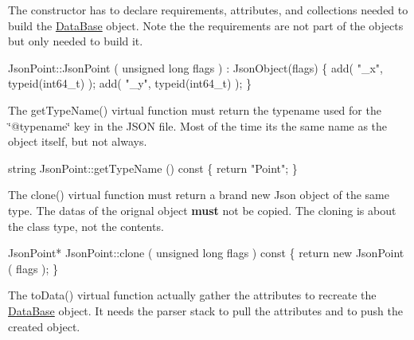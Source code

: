 The constructor has to declare requirements, attributes, and collections needed to build the \hyperlink{classHurricane_1_1DataBase}{Data\+Base} object. Note the the requirements are not part of the objects but only needed to build it.


\begin{DoxyCode}
JsonPoint::JsonPoint ( \textcolor{keywordtype}{unsigned} \textcolor{keywordtype}{long} flags )
  : JsonObject(flags)
\{
  add( \textcolor{stringliteral}{"\_x"}, \textcolor{keyword}{typeid}(int64\_t) );
  add( \textcolor{stringliteral}{"\_y"}, \textcolor{keyword}{typeid}(int64\_t) );
\}
\end{DoxyCode}


The {\ttfamily get\+Type\+Name()} virtual function must return the typename used for the {\ttfamily \char`\"{}@typename\char`\"{}} key in the J\+S\+ON file. Most of the time it\textquotesingle{}s the same name as the object itself, but not always.


\begin{DoxyCode}
\textcolor{keywordtype}{string} JsonPoint::getTypeName ()\textcolor{keyword}{ const}
\textcolor{keyword}{}\{ \textcolor{keywordflow}{return} \textcolor{stringliteral}{"Point"}; \}
\end{DoxyCode}


The {\ttfamily clone()} virtual function must return a brand new Json object of the same type. The datas of the orignal object {\bfseries must} not be copied. The cloning is about the class type, not the contents.


\begin{DoxyCode}
JsonPoint* JsonPoint::clone ( \textcolor{keywordtype}{unsigned} \textcolor{keywordtype}{long} flags )\textcolor{keyword}{ const}
\textcolor{keyword}{}\{ \textcolor{keywordflow}{return} \textcolor{keyword}{new} JsonPoint ( flags ); \}
\end{DoxyCode}


The {\ttfamily to\+Data()} virtual function actually gather the attributes to recreate the \hyperlink{classHurricane_1_1DataBase}{Data\+Base} object. It needs the parser stack to pull the attributes and to push the created object.


